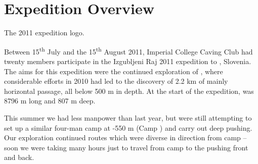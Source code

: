 \section{Expedition Overview}


\begin{marginfigure}
\checkoddpage \ifoddpage \forcerectofloat \else \forceversofloat \fi
\centering
 \caption{The 2011 expedition logo. }
 \label{2011 logo}
\end{marginfigure}

Between 15\textsuperscript{th} July and the 15\textsuperscript{th} August 2011, Imperial College Caving Club
had twenty members participate in the Izgubljeni Raj 2011 expedition to
, Slovenia. The aims for this expedition were the
continued exploration of , where considerable efforts in
2010 had led to the discovery of 2.2 km of mainly horizontal passage,
all below 500 m in depth. At the start of the expedition,
 was 8796 m long and 807 m deep.

This summer we had less manpower than last year, but were still
attempting to set up a similar four-man camp at -550 m (Camp ) and carry out
deep pushing. Our exploration continued routes which were diverse in
direction from camp -- soon we were taking many hours just to travel from
camp to the pushing front and back.

